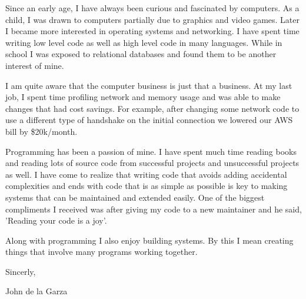 \documentclass{letter}
\begin{document}
Since an early age, I have always been curious and fascinated by computers.
As a child, I was drawn to computers partially due to graphics and
video games.  Later I became more interested in operating systems and
networking.  I have spent time writing low level code as
well as high level code in many languages.  While in school I was exposed
to relational databases and found them to be another interest of mine.

I am quite aware that the computer business is just that a business.
At my last job, I spent time profiling network and memory usage and
was able to make changes that had cost savings.  For example, after
changing some network code to use a different type of handshake on
the initial connection we lowered our AWS bill by \$20k/month.

Programming has been a passion of mine.  I have spent much time reading
books and reading lots of source code from successful projects and
unsuccessful projects as well.  I have come to realize that writing code
that avoids adding accidental complexities and ends with code that is
as simple as possible is key to making systems that can be maintained and
extended easily.  One of the biggest compliments I received was after
giving my code to a new maintainer and he said, 'Reading your code is
a joy'.

Along with programming I also enjoy building systems.  By this I mean
creating things that involve many programs working together.


Sincerly,

John de la Garza
\end{document}
